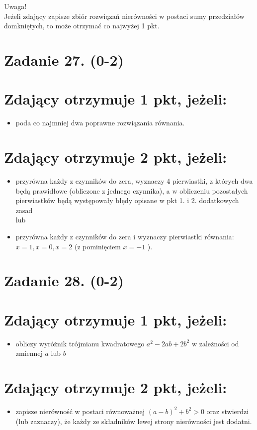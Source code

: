 \documentclass[10pt]{article}
\begin{document}
Uwaga!\\
Jeżeli zdający zapisze zbiór rozwiązań nierówności w postaci sumy przedziałów domkniętych, to może otrzymać co najwyżej 1 pkt.

\section*{Zadanie 27. (0-2)}
\section*{Zdający otrzymuje 1 pkt, jeżeli:}
\begin{itemize}
  \item poda co najmniej dwa poprawne rozwiązania równania.
\end{itemize}

\section*{Zdający otrzymuje 2 pkt, jeżeli:}
\begin{itemize}
  \item przyrówna każdy z czynników do zera, wyznaczy 4 pierwiastki, z których dwa będą prawidłowe (obliczone z jednego czynnika), a w obliczeniu pozostałych pierwiastków będą występowały błędy opisane w pkt 1. i 2. dodatkowych zasad\\
lub
  \item przyrówna każdy z czynników do zera i wyznaczy pierwiastki równania: $x=1, x=0, x=2$ (z pominięciem $x=-1$ ).
\end{itemize}

\section*{Zadanie 28. (0-2)}
\section*{Zdający otrzymuje 1 pkt, jeżeli:}
\begin{itemize}
  \item obliczy wyróżnik trójmianu kwadratowego $a^{2}-2 a b+2 b^{2}$ w zależności od zmiennej $a$ lub $b$
\end{itemize}

\section*{Zdający otrzymuje 2 pkt, jeżeli:}
\begin{itemize}
  \item zapisze nierówność w postaci równoważnej $(a-b)^{2}+b^{2}>0$ oraz stwierdzi (lub zaznaczy), że każdy ze składników lewej strony nierówności jest dodatni.
\end{itemize}
\end{document}
